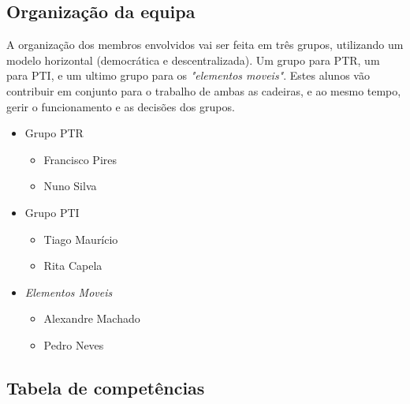 \documentclass[12pt, a4paper, twoside]{report} %
\begin{document}

\clearpage


\subsection{Organização da equipa}

A organização dos membros envolvidos vai ser feita em três grupos, utilizando um modelo horizontal (democrática e descentralizada).
Um grupo para PTR, um para PTI, e um ultimo grupo para os \textit {"elementos moveis"}. 
Estes alunos vão contribuir em conjunto para o trabalho de ambas as cadeiras, e ao mesmo tempo, gerir o funcionamento e as decisões dos grupos.

\begin{itemize}
\item Grupo PTR
\begin{itemize}
	\item Francisco Pires
	\item Nuno Silva
\end{itemize}
\item Grupo PTI
\begin{itemize}
	\item Tiago Maurício
	\item Rita Capela
\end{itemize}
\item \textit{Elementos Moveis}
\begin{itemize}
	\item Alexandre Machado
	\item Pedro Neves
\end{itemize}
\end{itemize}

\subsection{Tabela de competências}
\end{document}
